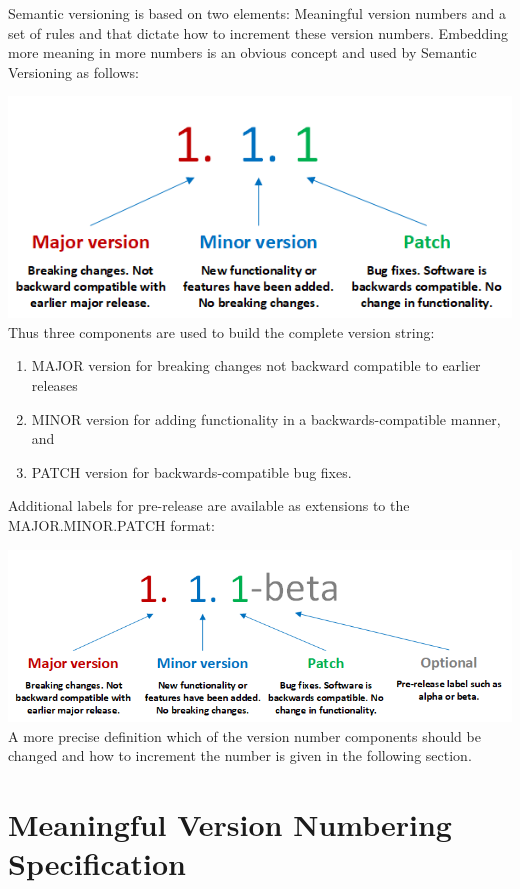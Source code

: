 \documentclass[10pt,a4paper]{article}
\begin{document}
Semantic versioning is based on two elements: Meaningful version numbers and a set of rules and that dictate how to increment these version numbers. Embedding more meaning in more numbers is an obvious concept and used by Semantic Versioning as follows:


\includegraphics[scale=0.75]{SemanticVersioning.png} 
\\

Thus three components are used to build the complete version string:
\begin{enumerate}
\item MAJOR version for breaking changes not backward compatible to earlier releases
\item MINOR version for adding functionality in a backwards-compatible manner, and
\item PATCH version for backwards-compatible bug fixes.
\end{enumerate}

Additional labels for pre-release are available as extensions to the \linebreak MAJOR.MINOR.PATCH format:

\includegraphics[scale=0.65]{SemanticVersioning2.png} 
\\
A more precise definition which of the version number components should be changed and how to increment the number is given in the following section.

\section*{Meaningful Version Numbering Specification}
\end{document}
